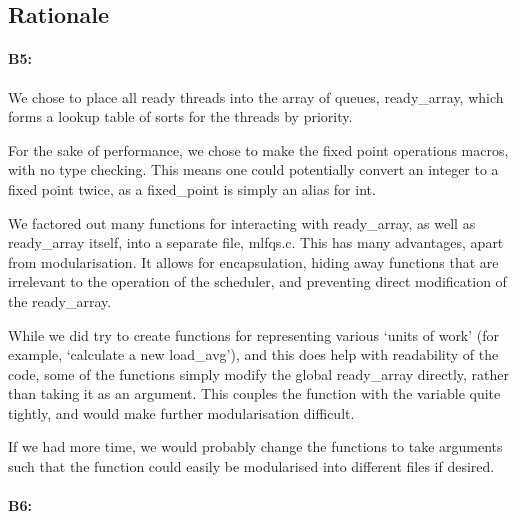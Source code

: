 \subsection{Rationale}
\paragraph{B5:} %

We chose to place all ready threads into the array of queues, ready\_array, which forms a lookup table of sorts for the threads by priority.

For the sake of performance, we chose to make the fixed point operations macros,
with no type checking. This means one could potentially convert an integer to a
fixed point twice, as a fixed_point is simply an alias for int.

We factored out many functions for interacting with ready\_array, as well as
ready\_array itself, into a separate file, mlfqs.c. This has many advantages,
apart from modularisation. It allows for encapsulation, hiding away functions
that are irrelevant to the operation of the scheduler, and preventing direct
modification of the ready\_array.

While we did try to create functions for representing various `units of work'
(for example, `calculate a new load_avg'), and this does help with readability
of the code, some of the functions simply modify the global ready\_array
directly, rather than taking it as an argument. This couples the function with
the variable quite tightly, and would make further modularisation difficult.

If we had more time, we would probably change the functions to take arguments
such that the function could easily be modularised into different files if
desired.

\paragraph{B6:} %

